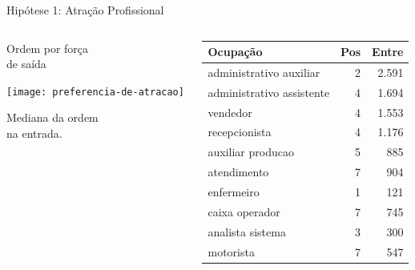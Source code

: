 \documentclass[10pt, hyperref={pdfpagelabels=false}]{beamer}
\begin{document}
\begin{frame}[c, label=hipotese-atracao]{Hipótese 1: Atração Profissional}
  \begin{center}
    \begin{columns}[onlytextwidth]
      \begin{column}{0.4\textwidth}
        \centering
        Ordem por força\\
        de \alert{saída}
        
        \begin{center}
        \texttt{[image: preferencia-de-atracao]}
        \end{center}
         
        Mediana da ordem\\
        na \alert{entrada}.
        
      \end{column}
      \begin{column}{0.6\textwidth}
        \centering
        \footnotesize
        \begin{table}[!h]
          \centering
          \begin{tabular}{l|r|r}
            \hline
            Ocupação & Pos & Entre\\
            \hline
            administrativo auxiliar & 2 & 2.591\\
            \hline
            administrativo assistente & 4 & 1.694\\
            \hline
            vendedor & 4 & 1.553\\
            \hline
            recepcionista & 4 & 1.176\\
            \hline
            auxiliar producao & 5 & 885\\
            \hline
            atendimento & 7 & 904\\
            \hline
            enfermeiro & 1 & 121\\
            \hline
            caixa operador & 7 & 745\\
            \hline
            analista sistema & 3 & 300\\
            \hline
            motorista & 7 & 547\\
            \hline
          \end{tabular}
        \end{table}
      \end{column}
    \end{columns}
  \end{center}
\end{frame}
\end{document}
